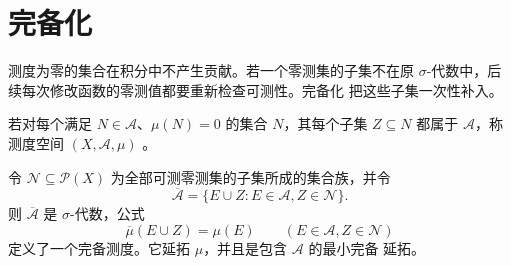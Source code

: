 \section{完备化}

测度为零的集合在积分中不产生贡献。若一个零测集的子集不在原
$\sigma$-代数中，后续每次修改函数的零测值都要重新检查可测性。完备化
把这些子集一次性补入。

\begin{definition}
若对每个满足 $N\in\mathcal A$、$\mu(N)=0$ 的集合 $N$，其每个子集
$Z\subseteq N$ 都属于 $\mathcal A$，称测度空间 $(X,\mathcal A,\mu)$ 。
\end{definition}

\begin{theorem}[测度空间的完备化]
\label{thm:measure-completion}
令 $\mathcal N\subseteq\mathcal P(X)$ 为全部可测零测集的子集所成的集合族，并令
\[
 \overline{\mathcal A}
 =\{E\cup Z:E\in\mathcal A, Z\in\mathcal N\}.
\]
则 $\overline{\mathcal A}$ 是 $\sigma$-代数，公式
\[
 \overline\mu(E\cup Z)=\mu(E)
 \qquad(E\in\mathcal A, Z\in\mathcal N)
\]
定义了一个完备测度。它延拓 $\mu$，并且是包含 $\mathcal A$ 的最小完备
延拓。
\end{theorem}

